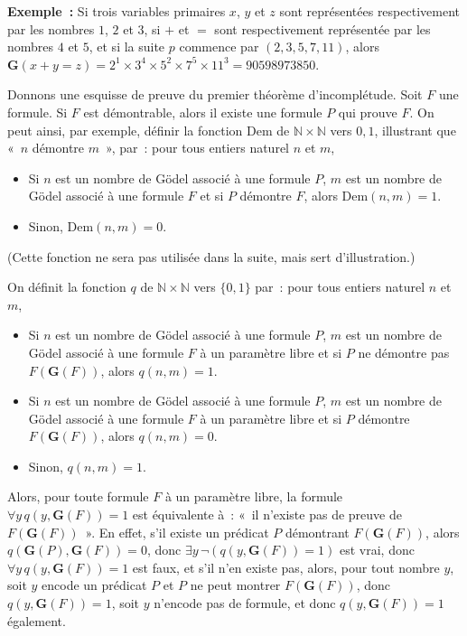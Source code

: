 \medskip

\noindent \textbf{Exemple :} Si trois variables primaires $x$, $y$ et $z$ sont représentées respectivement par les nombres $1$, $2$ et $3$, si $+$ et $=$ sont respectivement représentée par les nombres $4$ et $5$, et si la suite $p$ commence par $(2, 3, 5, 7, 11)$, alors $\mathbf{G}(x + y = z) = 2^1 \times 3^4 \times 5^2 \times 7^5 \times 11^3 = 90598973850$.

\medskip

\noindent Donnons une esquisse de preuve du premier théorème d'incomplétude.
Soit $F$ une formule. 
Si $F$ est démontrable, alors il existe une formule $P$ qui prouve $F$. 
On peut ainsi, par exemple, définir la fonction $\mathrm{Dem}$ de $\mathbb{N} \times \mathbb{N}$ vers ${0, 1}$, illustrant que « $n$ démontre $m$ », par : pour tous entiers naturel $n$ et $m$, 
\begin{itemize}[nosep]
    \item Si $n$ est un nombre de Gödel associé à une formule $P$, $m$ est un nombre de Gödel associé à une formule $F$ et si $P$ démontre $F$, alors $\mathrm{Dem}(n, m) = 1$.
    \item Sinon, $\mathrm{Dem}(n, m) = 0$. 
\end{itemize}
(Cette fonction ne sera pas utilisée dans la suite, mais sert d'illustration.)

On définit la fonction $q$ de $\mathbb{N} \times \mathbb{N}$ vers $\lbrace 0, 1 \rbrace$ par : pour tous entiers naturel $n$ et $m$, 
\begin{itemize}[nosep]
    \item Si $n$ est un nombre de Gödel associé à une formule $P$, $m$ est un nombre de Gödel associé à une formule $F$ à un paramètre libre et si $P$ ne démontre pas $F(\mathbf{G}(F))$, alors $q(n, m) = 1$.
    \item Si $n$ est un nombre de Gödel associé à une formule $P$, $m$ est un nombre de Gödel associé à une formule $F$ à un paramètre libre et si $P$ démontre $F(\mathbf{G}(F))$, alors $q(n, m) = 0$.
    \item Sinon, $q(n, m) = 1$. 
\end{itemize}
Alors, pour toute formule $F$ à un paramètre libre, la formule $\forall y \, q(y, \mathbf{G}(F)) = 1$ est équivalente à : « il n'existe pas de preuve de $F(\mathbf{G}(F))$ ». 
En effet, s'il existe un prédicat $P$ démontrant $F(\mathbf{G}(F))$, alors $q(\mathbf{G}(P), \mathbf{G}(F)) = 0$, donc $\exists y \, \neg (q(y, \mathbf{G}(F)) = 1)$ est vrai, donc $\forall y \, q(y, \mathbf{G}(F)) = 1$ est faux, et s'il n'en existe pas, alors, pour tout nombre $y$, soit $y$ encode un prédicat $P$ et $P$ ne peut montrer $F(\mathbf{G}(F))$, donc $q(y, \mathbf{G}(F)) = 1$, soit $y$ n'encode pas de formule, et donc $q(y, \mathbf{G}(F)) = 1$ également.

